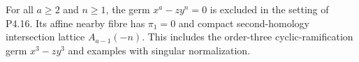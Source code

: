 
\begin{proposition}[P4.17]\hypertarget{tag-02WO}{}\label{night:P4.17}\label{stmt:P4.17}


For all $a\geq2$ and $n\geq1$, the germ $x^a-zy^n=0$ is
excluded in the setting of P4.16. Its affine nearby fibre has
$\pi_1=0$ and compact second-homology intersection lattice
$A_{a-1}(-n)$. This includes the order-three cyclic-ramification
germ $x^3-zy^3$ and examples with singular normalization.
\end{proposition}

